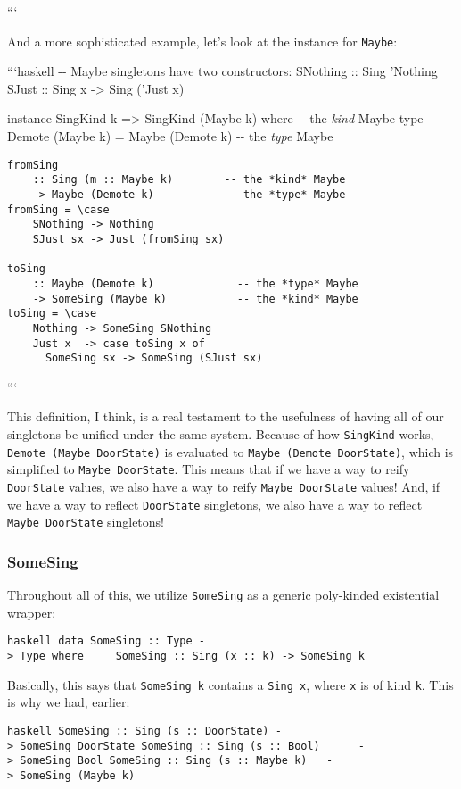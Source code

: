 \documentclass[]{article}
\begin{document}
```

And a more sophisticated example, let's look at the instance for \texttt{Maybe}:

```haskell -\/- Maybe singletons have two constructors: SNothing :: Sing
'Nothing SJust :: Sing x -\textgreater{} Sing ('Just x)

instance SingKind k =\textgreater{} SingKind (Maybe k) where -\/- the
\emph{kind} Maybe type Demote (Maybe k) = Maybe (Demote k) -\/- the \emph{type}
Maybe

\begin{verbatim}
fromSing
    :: Sing (m :: Maybe k)        -- the *kind* Maybe
    -> Maybe (Demote k)           -- the *type* Maybe
fromSing = \case
    SNothing -> Nothing
    SJust sx -> Just (fromSing sx)

toSing
    :: Maybe (Demote k)             -- the *type* Maybe
    -> SomeSing (Maybe k)           -- the *kind* Maybe
toSing = \case
    Nothing -> SomeSing SNothing
    Just x  -> case toSing x of
      SomeSing sx -> SomeSing (SJust sx)
\end{verbatim}

```

This definition, I think, is a real testament to the usefulness of having all of
our singletons be unified under the same system. Because of how
\texttt{SingKind} works, \texttt{Demote\ (Maybe\ DoorState)} is evaluated to
\texttt{Maybe\ (Demote\ DoorState)}, which is simplified to
\texttt{Maybe\ DoorState}. This means that if we have a way to reify
\texttt{DoorState} values, we also have a way to reify \texttt{Maybe\ DoorState}
values! And, if we have a way to reflect \texttt{DoorState} singletons, we also
have a way to reflect \texttt{Maybe\ DoorState} singletons!

\subsubsection{SomeSing}

Throughout all of this, we utilize \texttt{SomeSing} as a generic poly-kinded
existential wrapper:

\texttt{haskell\ data\ SomeSing\ ::\ Type\ -\textgreater{}\ Type\ where\ \ \ \ \ SomeSing\ ::\ Sing\ (x\ ::\ k)\ -\textgreater{}\ SomeSing\ k}

Basically, this says that \texttt{SomeSing\ k} contains a \texttt{Sing\ x},
where \texttt{x} is of kind \texttt{k}. This is why we had, earlier:

\texttt{haskell\ SomeSing\ ::\ Sing\ (s\ ::\ DoorState)\ -\textgreater{}\ SomeSing\ DoorState\ SomeSing\ ::\ Sing\ (s\ ::\ Bool)\ \ \ \ \ \ -\textgreater{}\ SomeSing\ Bool\ SomeSing\ ::\ Sing\ (s\ ::\ Maybe\ k)\ \ \ -\textgreater{}\ SomeSing\ (Maybe\ k)}
\end{document}
